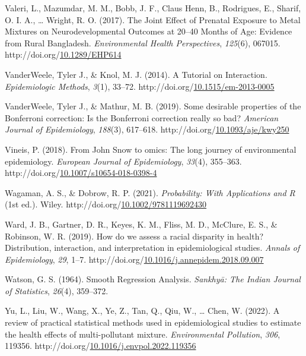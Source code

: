 \documentclass[12pt, twoside]{amherstthesis}
\newenvironment{CSLReferences}[2]%
  {}%
  {\par}
\begin{document}
\begin{CSLReferences}{1}{0}
\leavevmode{}%
Valeri, L., Mazumdar, M. M., Bobb, J. F., Claus Henn, B., Rodrigues, E., Sharif, O. I. A., \ldots{} Wright, R. O. (2017). The {Joint} {Effect} of {Prenatal} {Exposure} to {Metal} {Mixtures} on {Neurodevelopmental} {Outcomes} at 20--40 {Months} of {Age}: {Evidence} from {Rural} {Bangladesh}. \emph{Environmental Health Perspectives}, \emph{125}(6), 067015. http://doi.org/\href{https://doi.org/10.1289/EHP614}{10.1289/EHP614}

\leavevmode{}%
VanderWeele, Tyler J., \& Knol, M. J. (2014). A {Tutorial} on {Interaction}. \emph{Epidemiologic Methods}, \emph{3}(1), 33--72. http://doi.org/\href{https://doi.org/10.1515/em-2013-0005}{10.1515/em-2013-0005}

\leavevmode{}%
VanderWeele, Tyler J., \& Mathur, M. B. (2019). Some desirable properties of the {Bonferroni} correction: {Is} the {Bonferroni} correction really so bad? \emph{American Journal of Epidemiology}, \emph{188}(3), 617--618. http://doi.org/\href{https://doi.org/10.1093/aje/kwy250}{10.1093/aje/kwy250}

\leavevmode{}%
Vineis, P. (2018). From {John} {Snow} to omics: The long journey of environmental epidemiology. \emph{European Journal of Epidemiology}, \emph{33}(4), 355--363. http://doi.org/\href{https://doi.org/10.1007/s10654-018-0398-4}{10.1007/s10654-018-0398-4}

\leavevmode{}%
Wagaman, A. S., \& Dobrow, R. P. (2021). \emph{Probability: {With} {Applications} and {R}} (1st ed.). Wiley. http://doi.org/\href{https://doi.org/10.1002/9781119692430}{10.1002/9781119692430}

\leavevmode{}%
Ward, J. B., Gartner, D. R., Keyes, K. M., Fliss, M. D., McClure, E. S., \& Robinson, W. R. (2019). How do we assess a racial disparity in health? {Distribution}, interaction, and interpretation in epidemiological studies. \emph{Annals of Epidemiology}, \emph{29}, 1--7. http://doi.org/\href{https://doi.org/10.1016/j.annepidem.2018.09.007}{10.1016/j.annepidem.2018.09.007}

\leavevmode{}%
Watson, G. S. (1964). Smooth {Regression} {Analysis}. \emph{Sankhyā: The Indian Journal of Statistics}, \emph{26}(4), 359--372.

\leavevmode{}%
Yu, L., Liu, W., Wang, X., Ye, Z., Tan, Q., Qiu, W., \ldots{} Chen, W. (2022). A review of practical statistical methods used in epidemiological studies to estimate the health effects of multi-pollutant mixture. \emph{Environmental Pollution}, \emph{306}, 119356. http://doi.org/\href{https://doi.org/10.1016/j.envpol.2022.119356}{10.1016/j.envpol.2022.119356}

\end{CSLReferences}
\end{document}

